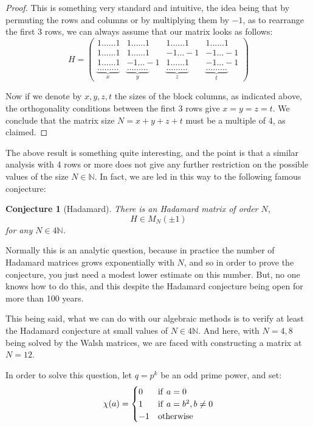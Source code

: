\documentclass[12pt]{amsbook}
\newtheorem{conjecture}[theorem]{Conjecture}
\begin{document}
\begin{proof}
This is something very standard and intuitive, the idea being that by permuting the rows and columns or by multiplying them by $-1$, as to rearrange the first 3 rows, we can always assume that our matrix looks as follows:
$$H=\begin{pmatrix}
1\ldots\ldots 1&1\ldots\ldots 1&1\ldots\ldots 1&1\ldots\ldots 1\\
1\ldots\ldots 1&1\ldots\ldots 1&-1\ldots -1&-1\ldots -1\\
1\ldots\ldots 1&-1\ldots -1&1\ldots\ldots 1&-1\ldots -1\\
\underbrace{\ldots\ldots\ldots}_x&\underbrace{\ldots\ldots\ldots}_y&\underbrace{\ldots\ldots\ldots}_z&\underbrace{\ldots\ldots\ldots}_t
\end{pmatrix}$$

Now if we denote by $x,y,z,t$ the sizes of the block columns, as indicated above, the orthogonality conditions between the first 3 rows give $x=y=z=t$. We conclude that the matrix size $N=x+y+z+t$ must be a multiple of 4, as claimed.
\end{proof}

The above result is something quite interesting, and the point is that a similar analysis with 4 rows or more does not give any further restriction on the possible values of the size $N\in\mathbb N$. In fact, we are led in this way to the following famous conjecture:

\begin{conjecture}[Hadamard]
There is an Hadamard matrix of order $N$,
$$H\in M_N(\pm1)$$
for any $N\in4\mathbb N$.
\end{conjecture}

Normally this is an analytic question, because in practice the number of Hadamard matrices grows exponentially with $N$, and so in order to prove the conjecture, you just need a modest lower estimate on this number. But, no one knows how to do this, and this despite the Hadamard conjecture being open for more than 100 years.

\bigskip

This being said, what we can do with our algebraic methods is to verify at least the Hadamard conjecture at small values of $N\in4\mathbb N$. And here, with $N=4,8$ being solved by the Walsh matrices, we are faced with constructing a matrix at $N=12$.

\bigskip

In order to solve this question, let $q=p^k$ be an odd prime power, and set: 
$$\chi(a)=\begin{cases}
0&{\rm if}\ a=0\\
1&{\rm if}\ a=b^2,b\neq0\\
-1&{\rm otherwise}
\end{cases}$$
\end{document}

